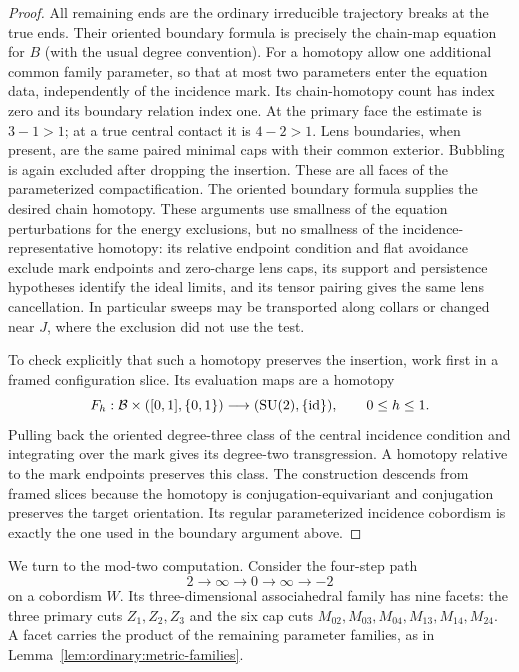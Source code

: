 \begin{proof}
All remaining ends are the ordinary irreducible trajectory breaks at
the true ends.  Their oriented boundary formula is precisely the
chain-map equation for $B$ (with the usual degree convention).
For a homotopy allow one additional common family parameter, so that
at most two parameters enter the equation data, independently of the
incidence mark.  Its chain-homotopy count has index zero and its boundary
relation index one.  At the
primary face the estimate is $3-1>1$; at a true central contact it is
$4-2>1$.  Lens boundaries, when present, are the same paired minimal
caps with their common exterior.  Bubbling is again excluded after
dropping the insertion.  These are all faces of the parameterized
compactification.  The oriented boundary formula supplies the desired
chain homotopy.  These arguments use smallness of the equation
perturbations for the energy exclusions, but no smallness of the
incidence-representative homotopy: its relative endpoint condition and
flat avoidance exclude mark endpoints and zero-charge lens caps,
its support and persistence hypotheses identify the ideal limits, and
its tensor pairing gives the same lens cancellation.  In particular
sweeps may be transported along collars or changed near $J$, where
the exclusion did not use the test.

To check explicitly that such a homotopy preserves the insertion,
work first in a framed configuration slice.  Its evaluation maps
are a homotopy
\[
 F_h:\mathcal B\times([0,1],\{0,1\})
           \longrightarrow(\operatorname{SU}(2),\{\operatorname{id}\}),\qquad 0\le h\le1.
\]
Pulling back the oriented degree-three class of the central incidence
condition and integrating over the mark gives its degree-two
transgression.  A homotopy relative to the mark endpoints preserves
this class.  The construction descends from framed slices because
the homotopy is conjugation-equivariant and conjugation preserves the
target orientation.  Its regular parameterized incidence cobordism
is exactly the one used in the boundary argument above.
\end{proof}

We turn to the mod-two computation.  Consider the four-step path
\begin{equation}\label{eq:negative:four-step}
 2\longrightarrow\infty\longrightarrow0
     \longrightarrow\infty\longrightarrow-2
\end{equation}
on a cobordism $W$.  Its three-dimensional associahedral family has
nine facets: the three primary cuts $Z_1,Z_2,Z_3$ and the six cap cuts
$M_{02},M_{03},M_{04},M_{13},M_{14},M_{24}$.  A facet carries the
product of the remaining parameter families, as in
Lemma~\ref{lem:ordinary:metric-families}.

